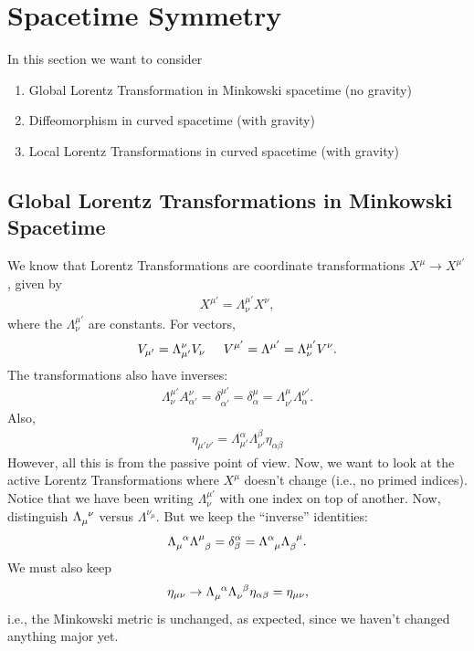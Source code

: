\documentclass{book}
\numberwithin{equation}{section}
\theoremstyle{definition}
\begin{document}
\section{Spacetime Symmetry}

In this section we want to consider
\begin{enumerate}
	\item Global Lorentz Transformation in Minkowski spacetime (no gravity)
	\item Diffeomorphism in curved spacetime (with gravity)
	\item Local Lorentz Transformations in curved spacetime (with gravity)
\end{enumerate}

\subsection{Global Lorentz Transformations in Minkowski Spacetime}
We know that Lorentz Transformations are coordinate transformations $X^\mu \to X^{\mu'}$, given by
\begin{align}
X^{\mu'} = \Lambda^{\mu'}_\nu X^\nu,
\end{align}
where the $\Lambda^{\mu'}_\nu$ are constants. For vectors,
\begin{align}
V_{\mu'} = \Lambda^\nu_{\mu'}V_\nu \hspace{0.5cm} V^{\mu'} = \Lambda^{\mu'} = \Lambda^{\mu'}_\nu V^\nu.
\end{align}
The transformations also have inverses:
\begin{align}
\Lambda^{\mu'}_\nu A^{\nu}_{\alpha'} = \delta^{\mu'}_{\alpha'} = \delta^{\mu}_{\alpha} = \Lambda^\mu_{\nu'}\Lambda^{\nu'}_{\alpha}.
\end{align}
Also, 
\begin{align}
\eta_{\mu'\nu'} = \Lambda^\alpha_{\mu'}\Lambda^{\beta}_{\nu'}\eta_{\alpha\beta}
\end{align}
However, all this is from the passive point of view. Now, we want to look at the active Lorentz Transformations where $X^\mu$ doesn't change (i.e., no primed indices). Notice that we have been writing  $\Lambda^{\mu'}_\nu$ with one index on top of another. Now, distinguish $\tensor{\Lambda}{_\mu^\nu}$ versus $\Lambda^{\nu_\mu}$. But we keep the ``inverse'' identities:
\begin{align}
\tensor{\Lambda}{_\mu^\alpha} \tensor{\Lambda}{^\mu_\beta} = \delta^\alpha_\beta = \tensor{\Lambda}{^\alpha_\mu}\tensor{\Lambda}{_\beta^\mu}.
\end{align}
We must also keep
\begin{align}
\eta_{\mu\nu} \to \tensor{\Lambda}{_\mu^\alpha}\tensor{\Lambda}{_\nu^\beta}\eta_{\alpha\beta} = \eta_{\mu\nu},
\end{align}
i.e., the Minkowski metric is unchanged, as expected, since we haven't changed anything major yet.\\
\end{document}
